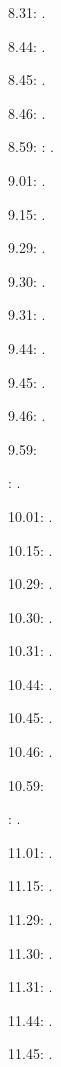 \documentclass[italian]{article}
\begin{document}
8.31:   .

8.44:   .

8.45:   .

8.46:   .

8.59:   
:  .

9.01:   . 

9.15:   . 

9.29:   . 

9.30:   .

9.31:   .

9.44:   .

9.45:   .

9.46:   .

9.59:   

:  .

10.01:   . 

10.15:   . 

10.29:   . 

10.30:   .

10.31:   .

10.44:   .

10.45:   .

10.46:   .

10.59:   

:  .

11.01:   . 

11.15:   . 

11.29:   . 

11.30:   .

11.31:   .

11.44:   .

11.45:   .
\end{document}
